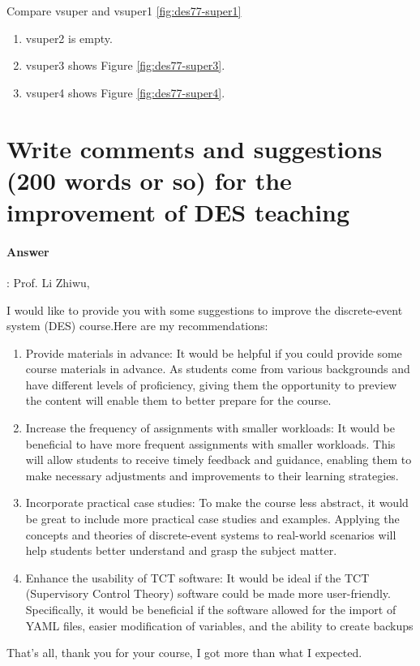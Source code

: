 \documentclass{article}
\begin{document}
Compare vsuper and vsuper1 \ref{fig:des77-super1}

\begin{enumerate}
  \item vsuper2 is empty.
  \item vsuper3 shows Figure \ref{fig:des77-super3}.
  \item vsuper4 shows Figure \ref{fig:des77-super4}.
\end{enumerate}


\section{Write comments and suggestions (200 words or so) for the improvement of DES teaching}

\paragraph{Answer}:
Prof. Li Zhiwu,

I would like to provide you with some suggestions to improve the discrete-event system (DES) course.Here are my recommendations:

\begin{enumerate}
  \item Provide materials in advance: It would be helpful if you could provide some course materials in advance. As students come from various backgrounds and have different levels of proficiency, giving them the opportunity to preview the content will enable them to better prepare for the course.

  \item Increase the frequency of assignments with smaller workloads: It would be beneficial to have more frequent assignments with smaller workloads. This will allow students to receive timely feedback and guidance, enabling them to make necessary adjustments and improvements to their learning strategies.

  \item Incorporate practical case studies: To make the course less abstract, it would be great to include more practical case studies and examples. Applying the concepts and theories of discrete-event systems to real-world scenarios will help students better understand and grasp the subject matter.

  \item Enhance the usability of TCT software: It would be ideal if the TCT (Supervisory Control Theory) software could be made more user-friendly. Specifically, it would be beneficial if the software allowed for the import of YAML files, easier modification of variables, and the ability to create backups
\end{enumerate}

That's all, thank you for your course, I got more than what I expected.
\end{document}
